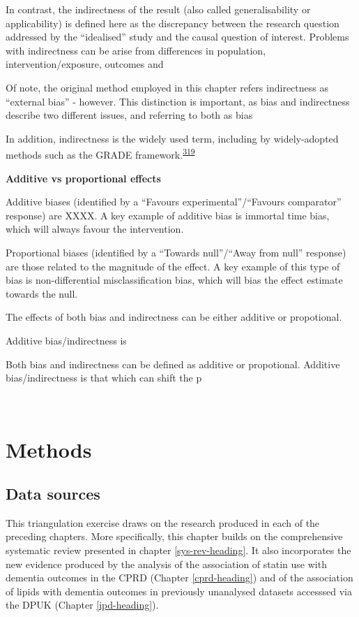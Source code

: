 \documentclass[a4paper, twoside]{templates/ociamthesis}
\begin{document}
In contrast, the indirectness of the result (also called generalisability or applicability) is defined here as the discrepancy between the research question addressed by the ``idealised'' study and the causal question of interest. Problems with indirectness can be arise from differences in population, intervention/exposure, outcomes and

Of note, the original method employed in this chapter refers indirectness as ``external bias'' - however. This distinction is important, as bias and indirectness describe two different issues, and referring to both as bias

In addition, indirectness is the widely used term, including by widely-adopted methods such as the GRADE framework.\textsuperscript{\protect\hyperlink{ref-guyatt2011}{319}}

\textbf{Additive vs proportional effects}

Additive biases (identified by a ``Favours experimental''/``Favours comparator'' response) are XXXX. A key example of additive bias is immortal time bias, which will always favour the intervention.

Proportional biases (identified by a ``Towards null''/``Away from null'' response) are those related to the magnitude of the effect. A key example of this type of bias is non-differential misclassification bias, which will bias the effect estimate towards the null.

The effects of both bias and indirectness can be either additive or propotional.

Additive bias/indirectness is

Both bias and indirectness can be defined as additive or propotional. Additive bias/indirectness is that which can shift the p

~

\newpage

\hypertarget{methods-3}{%
\section{Methods}\label{methods-3}}

\hypertarget{tri-data-sources}{%
\subsection{Data sources}\label{tri-data-sources}}

This triangulation exercise draws on the research produced in each of the preceding chapters. More specifically, this chapter builds on the comprehensive systematic review presented in chapter \ref{sys-rev-heading}. It also incorporates the new evidence produced by the analysis of the association of statin use with dementia outcomes in the CPRD (Chapter \ref{cprd-heading}) and of the association of lipids with dementia outcomes in previously unanalysed datasets accesssed via the DPUK (Chapter \ref{ipd-heading}).
\end{document}
